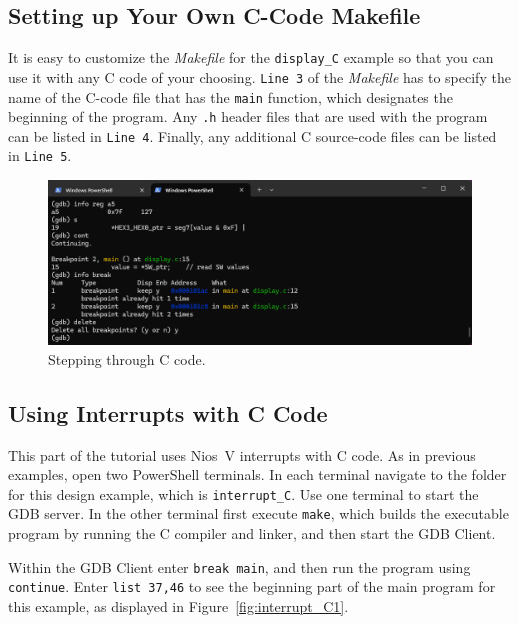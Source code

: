 \documentclass[11pt, twoside, pdftex]{article}
\begin{document}
\subsection{Setting up Your Own C-Code Makefile}
\label{sec:yourownass}

It is easy to customize the {\it Makefile} for the \texttt{display\_C} example so that you
can use it with any C code of your choosing.  \texttt{Line 3} of the
{\it Makefile} has to specify the name of the C-code file that has the \texttt{main}
function, which designates the beginning of the program. Any \texttt{.h} header files that are
used with the program can be listed in \texttt{Line~4}. Finally, any additional 
C source-code files can be listed in \texttt{Line 5}. 

\begin{figure}[H]
    \begin{center}
        \includegraphics[scale=.6]{figures/display_C4.png}
        \caption{Stepping through C code.}
        \label{fig:display_C4}
    \end{center}
\end{figure}

\subsection{Using Interrupts with C Code}

This part of the tutorial uses Nios~V interrupts with C code. 
As in previous examples, open two PowerShell terminals. In each terminal 
navigate to the folder for this design example, which is \texttt{interrupt\_C}. Use one 
terminal to start the GDB server. In the other terminal first execute \texttt{make}, which 
builds the executable program by running the C compiler and linker, and then start the GDB 
Client.

Within the GDB Client enter \texttt{break main}, and then run the program using \texttt{continue}.
Enter \texttt{list 37,46} to see the beginning part of the main program for this example, as 
displayed in Figure~\ref{fig:interrupt_C1}.
\end{document}
